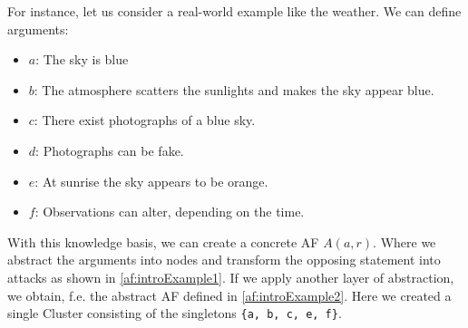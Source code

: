 For instance, let us consider a real-world example like the weather. We can define arguments:

\begin{itemize}
    \item $a$: The sky is blue
    \item $b$: The atmosphere scatters the sunlights and makes the sky appear blue. 
    \item $c$: There exist photographs of a blue sky. 
    \item $d$: Photographs can be fake.
    \item $e$: At sunrise the sky appears to be orange. 
    \item $f$: Observations can alter, depending on the time.
\end{itemize}

With this knowledge basis, we can create a concrete \ac{AF} $A(a, r)$. Where we abstract the arguments into nodes and transform the opposing statement into attacks as shown in \ref{af:introExample1}. If we apply another layer of abstraction, we obtain, f.e. the abstract \ac{AF} defined in \ref{af:introExample2}. Here we created a single Cluster consisting of the singletons \texttt{\{a, b, c, e, f\}}.




